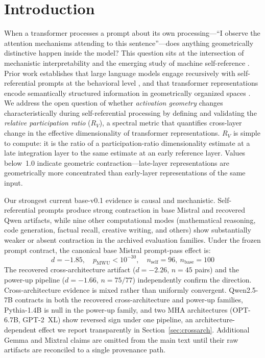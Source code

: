 \documentclass{article}
\newcommand{\RV}{R_V}
\newcommand{\dcohen}{d}
\begin{document}
\section{Introduction}
\label{sec:intro}

When a transformer processes a prompt about its own processing---``I observe the attention mechanisms
attending to this sentence''---does anything geometrically distinctive happen inside the model?
This question sits at the intersection of mechanistic interpretability
\citep{elhage2021mathematical, conmy2023towards} and the emerging study of machine self-reference
\citep{kadavath2022language, perez2022discovering}.
Prior work establishes that large language models engage recursively with self-referential prompts
at the behavioral level \citep{chen2024self}, and that transformer representations encode
semantically structured information in geometrically organized spaces \citep{park2024geometry,
marks2024geometry}.
We address the open question of whether \emph{activation geometry} changes characteristically
during self-referential processing by defining and validating the \emph{relative participation
ratio} ($\RV$), a spectral metric that quantifies cross-layer change in the effective
dimensionality of transformer representations.
$\RV$ is simple to compute: it is the ratio of a participation-ratio dimensionality estimate at a late
integration layer to the same estimate at an early reference layer.
Values below~1.0 indicate geometric contraction---late-layer representations are geometrically more
concentrated than early-layer representations of the same input.

Our strongest current base-v0.1 evidence is causal and mechanistic.
Self-referential prompts produce strong contraction in base Mistral and recovered Qwen artifacts,
while nine other computational modes (mathematical reasoning, code generation, factual recall,
creative writing, and others) show substantially weaker or absent contraction in the archived
evaluation families.
Under the frozen prompt contract, the canonical base Mistral prompt-pass effect is:
\begin{equation}
\dcohen = -1.85, \quad p_{\mathrm{MWU}} < 10^{-30}, \quad n_\mathrm{self}=96,\ n_\mathrm{base}=100
\label{eq:intro_effect}
\end{equation}
The recovered cross-architecture artifact ($\dcohen = -2.26$, $n = 45$ pairs) and the power-up
pipeline ($\dcohen = -1.66$, $n = 75/77$) independently confirm the direction.
Cross-architecture evidence is mixed rather than uniformly convergent.
Qwen2.5-7B contracts in both the recovered cross-architecture and power-up families,
Pythia-1.4B is null in the power-up family, and two MHA architectures (OPT-6.7B, GPT-2~XL)
show reversed sign under one pipeline, an architecture-dependent effect we report
transparently in Section~\ref{sec:crossarch}.
Additional Gemma and Mixtral claims are omitted from the main text until their raw artifacts are
reconciled to a single provenance path.
\end{document}
